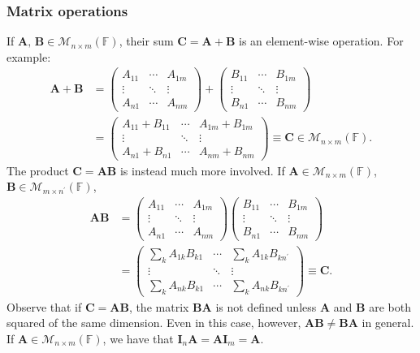 \documentclass{article}
\begin{document}
\subsubsection{Matrix operations}
If $\mathbf{A},\,\mathbf{B}\in\mathcal{M}_{n\times m}(\mathbb{F})$, their sum $\mathbf{C}=\mathbf{A}+\mathbf{B}$ is an element-wise operation. For example:
\begin{align}
    \mathbf{A}+\mathbf{B} &= \begin{pmatrix} A_{11} & \cdots & A_{1m} \\
\vdots & \ddots & \vdots \\
A_{n1} & \cdots & A_{nm}\end{pmatrix} + \begin{pmatrix} B_{11} & \cdots & B_{1m} \\
\vdots & \ddots & \vdots \\
B_{n1} & \cdots & B_{nm}\end{pmatrix}\\
&= \begin{pmatrix} A_{11}+B_{11} & \cdots & A_{1m}+B_{1m} \\
\vdots & \ddots & \vdots \\
A_{n1}+B_{n1} & \cdots & A_{nm}+B_{nm}\end{pmatrix} \equiv \mathbf{C}\in\mathcal{M}_{n\times m}(\mathbb{F}).
\end{align}
The product $\mathbf{C} = \mathbf{AB}$ is instead much more involved. If $\mathbf{A}\in\mathcal{M}_{n\times m}(\mathbb{F})$, $\mathbf{B}\in\mathcal{M}_{m\times n^\prime}(\mathbb{F})$,
\begin{align}
    \mathbf{AB} &= \begin{pmatrix} A_{11} & \cdots & A_{1m} \\
\vdots & \ddots & \vdots \\
A_{n1} & \cdots & A_{nm}\end{pmatrix}\begin{pmatrix} B_{11} & \cdots & B_{1m} \\
\vdots & \ddots & \vdots \\
B_{n1} & \cdots & B_{nm}\end{pmatrix} \\
&= \begin{pmatrix} \sum_k A_{1k}B_{k1} & \cdots & \sum_k A_{1k}B_{kn^\prime} \\
\vdots & \ddots & \vdots \\
\sum_k A_{nk}B_{k1} & \cdots & \sum_k A_{nk}B_{kn^\prime} \end{pmatrix} \equiv \mathbf{C}.
\end{align}
Observe that if $\mathbf{C}=\mathbf{AB}$, the matrix $\mathbf{BA}$ is not defined unless $\mathbf{A}$ and $\mathbf{B}$ are both squared of the same dimension. Even in this case, however, $\mathbf{AB}\neq\mathbf{BA}$ in general.\\
If $\mathbf{A}\in\mathcal{M}_{n\times m}(\mathbb{F})$, we have that $\mathbf{I}_n\mathbf{A} = \mathbf{A}\mathbf{I}_m = \mathbf{A}$.
\end{document}
